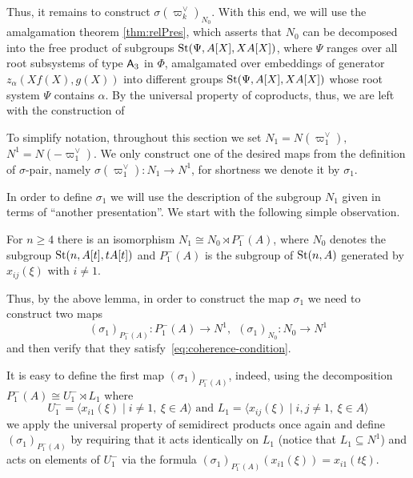 Thus, it remains to construct $\sigma({\varpi_k^\vee})_{N_0}$.
With this end, we will use the amalgamation theorem \cref{thm:relPres}, which asserts that $N_0$ can be decomposed into the free product of subgroups $\operatorname{St}(\Psi, A[X], XA[X])$,
 where $\Psi$ ranges over all root subsystems of type $\mathsf{A}_3$ in $\Phi$, amalgamated over embeddings of generator $z_\alpha(Xf(X), g(X))$ into different groups $\operatorname{St}(\Psi, A[X], XA[X])$ whose root system $\Psi$ contains $\alpha$.
By the universal property of coproducts, thus, we are left with the construction of

To simplify notation, throughout this section we set $N_1 = N(\varpi_1^\vee),$ $N^1 = N(-\varpi_1^\vee)$.
We only construct one of the desired maps from the definition of $\sigma$-pair, namely $\sigma(\varpi_1^\vee) \colon N_1 \to N^1$,
for shortness we denote it by $\sigma_1$.

In order to define $\sigma_1$ we will use the description of the subgroup $N_1$ given in terms of ``another presentation''.
We start with the following simple observation.
\begin{lemma}
    \label{lem:n1-decomp} For $n\geq 4$ there is an isomorphism $N_1 \cong N_{0} \rtimes P_1^-(A)$,
    where $N_{0}$ denotes the subgroup $\operatorname{St}(n, A[t], tA[t])$ and $P_1^-(A)$ is the subgroup of $\operatorname{St}(n, A)$ generated by $x_{ij}(\xi)$ with $i\neq 1$.
\end{lemma}

Thus, by the above lemma, in order to construct the map $\sigma_1$ we need to construct two maps
\[ (\sigma_1)_{P_1^-(A)} \colon P_1^-(A) \to N^1, \ \ (\sigma_1)_{N_{0}} \colon N_{0} \to N^1\]
and then verify that they satisfy~\eqref{eq:coherence-condition}.

It is easy to define the first map $(\sigma_1)_{P_1^-(A)}$, indeed, using the decomposition $P_1^-(A) \cong U^-_1 \rtimes L_1$ where %
\[U^-_1 = \langle x_{i1}(\xi) \mid i\neq 1,\ \xi\in A \rangle \text{ and } L_1 = \langle x_{ij}(\xi) \mid i,  j \neq 1,\ \xi\in A\rangle \]
we apply the universal property of semidirect products once again
and define $(\sigma_1)_{P_1^-(A)}$ by requiring that it acts identically on $L_1$ (notice that $L_1 \subseteq N^1$) %
and acts on elements of $U^-_1$ via the formula $(\sigma_1)_{P_1^-(A)}(x_{i1}(\xi))= x_{i1}(t\xi)$.


